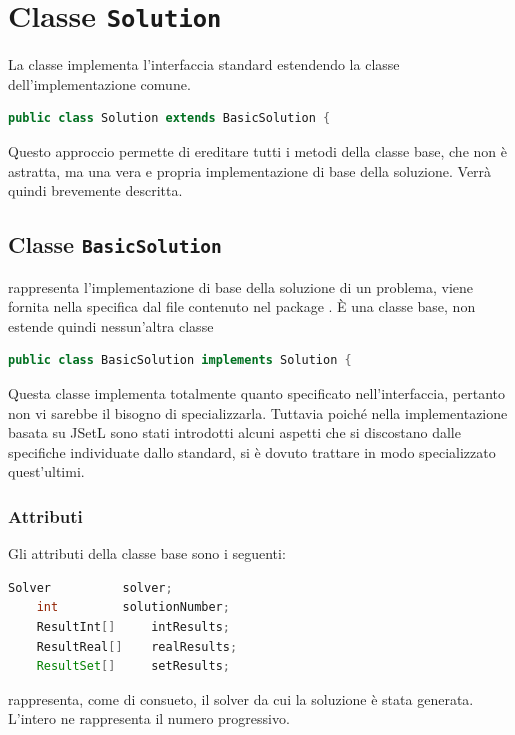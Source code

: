 \section{Classe \texttt{Solution}}\label{jsetlSolution}
La classe  implementa l'interfaccia standard
 estendendo la classe  dell'implementazione
comune.
\begin{lstlisting}[language = Java,
                   frame = single]
public class Solution extends BasicSolution {
\end{lstlisting}
Questo approccio permette di ereditare tutti i metodi della classe base, che
non è astratta, ma una vera e propria implementazione di base
della soluzione. Verrà quindi brevemente descritta.

\subsection{Classe \texttt{BasicSolution}}
 rappresenta l'implementazione di base della soluzione
di un problema, viene fornita nella specifica dal file 
 contenuto nel package 
. \`E una classe base, non
estende quindi nessun'altra classe
\begin{lstlisting}[language = Java,
                   frame = single]
public class BasicSolution implements Solution {
\end{lstlisting}

Questa classe implementa totalmente quanto specificato nell'interfaccia, 
pertanto non vi sarebbe il bisogno di specializzarla. Tuttavia poiché nella
implementazione basata su JSetL sono stati introdotti alcuni aspetti che
si discostano dalle specifiche individuate dallo standard, si è dovuto trattare
in modo specializzato quest'ultimi.

\subsubsection{Attributi}
Gli attributi della classe base sono i seguenti:
\begin{lstlisting}[language = Java,
                   frame = single]
	Solver 	        solver;
	int 		solutionNumber;
	ResultInt[] 	intResults;
	ResultReal[] 	realResults;
	ResultSet[] 	setResults;
\end{lstlisting}
 rappresenta, come di consueto, il solver da cui la soluzione
è stata generata. L'intero  ne rappresenta il numero
progressivo.

